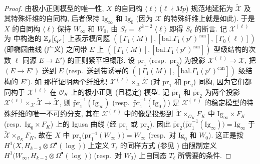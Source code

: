 \begin{proof}
由极小正则模型的唯一性, $X$ 的自同构 $\langle \ell \rangle$ ($\ell \nmid Mp$) 规范地延拓为 $\widetilde{\mathcal{X}}$ 及其特殊纤维的自同构, 后者保持 $\mathrm{Ig}_{\infty}$ 和 $\mathrm{Ig}_0$ (因为 $\mathcal{X}$ 的特殊纤维上就是如此).
于是 $X$ 的自同构 $\langle \ell \rangle$ 保持 $W_{\infty}$ 和 $W_0$, 由 $S_{\ell} = \ell^{k-2}\langle \ell \rangle$ 即得 $S_{\ell}$ 的断言.
记 $\mathcal{X}^{(\ell)}$ 为 \cite{ref:36} 中构造的 $\mathbb{Z}_p[\zeta_{p^{r}}]$ 上表示模问题 $([\Gamma_1(M)],[\mathrm{bal.}\Gamma_1(p^{r})^{\mathrm{can}}],[\Gamma_0(\ell)])$ (即椭圆曲线 (广义) 之间带 $E$ 上 $([\Gamma_1(M)],[\mathrm{bal.}\Gamma_1(p^{r})^{\mathrm{can}}])$ 型级结构的次数 $\ell$ 同源 $E \to E'$) 的正则紧平坦概形.
设 $\mathrm{pr}_1$ (resp.\ $\mathrm{pr}_2$) 为投影 $\mathcal{X}^{(\ell)} \to \mathcal{X}$, 把 $(E \to E')$ 送到 $E$ (resp.\ 送到带诱导的 $([\Gamma_1(M)],[\mathrm{bal.}\Gamma_1(p^{r})^{\mathrm{can}}])$ 级结构的 $E'$).
如 \cite{ref:40} 那样证明两个纤维积 $\mathcal{X}^{(\ell)} \times_{\mathcal{X}} \widetilde{\mathcal{X}}$ (对 $\mathrm{pr}_1$ 和 $\mathrm{pr}_2$) 同构, 因为它们都同构于 $\mathcal{X}^{(\ell)}$ 在 $\mathcal{O}_K$ 上的极小正则 (且稳定) 模型.
记 $\widetilde{\mathrm{pr}}_1$ 和 $\widetilde{\mathrm{pr}}_2$ 为两个投影 $\mathcal{X}^{(\ell)} \times_{\mathcal{X}} \widetilde{\mathcal{X}} \to \widetilde{\mathcal{X}}$, 则 $\widetilde{\mathrm{pr}}_1^{-1}(\mathrm{Ig}_{\infty})$ (resp.\ $\widetilde{\mathrm{pr}}_1^{-1}(\mathrm{Ig}_0)$) 是 $\mathcal{X}^{(\ell)}$ 的稳定模型的特殊纤维的唯一不可约分支, 其在 $\mathcal{X}^{(\ell)}$ 中的像是投影到 $\widetilde{\mathcal{X}} \times_{\mathcal{O}_K} F_K$ 中 $\mathrm{Ig}_{\infty} \times F_K$ (resp.\ $\mathrm{Ig}_0 \times F_K$) 上的 Igusa 曲线 (经 $\mathrm{pr}_1$ 或 $\mathrm{pr}_2$).
因此 $\widetilde{\mathrm{pr}}_2\bigl(\widetilde{\mathrm{pr}}_1^{-1}(\mathrm{Ig}_{\infty})\bigr) = \mathrm{Ig}_{\infty}$ 于 $\widetilde{\mathcal{X}} \times_{\mathcal{O}_K} F_K$, 故在 $X$ 中 $\mathrm{pr}_2\bigl(\mathrm{pr}_1^{-1}(W_{\infty})\bigr) = W_{\infty}$ (resp.\ 对 $\mathrm{Ig}_0$ 和 $W_0$).
这正是按 $H^{1}\bigl(X,H_{k-2} \otimes \Omega^{\bullet}(\log)\bigr)$ 上定义 $T_{\ell}$ 的同样方式 (参见 \cite[\S8]{ref:12}) 由限制定义 $H^{1}\bigl(W_{\infty},H_{k-2} \otimes \Omega^{\bullet}(\log)\bigr)$ (resp.\ 对 $W_0$) 上自同态 $T_{\ell}$ 所需要的条件.
\end{proof}

